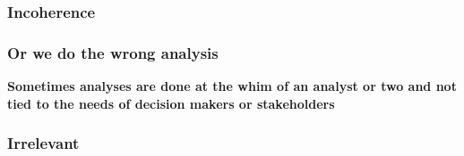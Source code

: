 \documentclass{beamer}
\begin{document}
{
\begin{frame}[plain]
\frametitle{Incoherence}
\end{frame}
}

\begin{frame}
\frametitle{Or we do the wrong analysis}
\begin{center}
\Large \textbf{Sometimes analyses are done at the whim of an analyst or two and not tied to the needs of decision makers or stakeholders}
\end{center}
\end{frame}

{
\begin{frame}[plain]
\frametitle{Irrelevant}
\end{frame}
}
\end{document}
